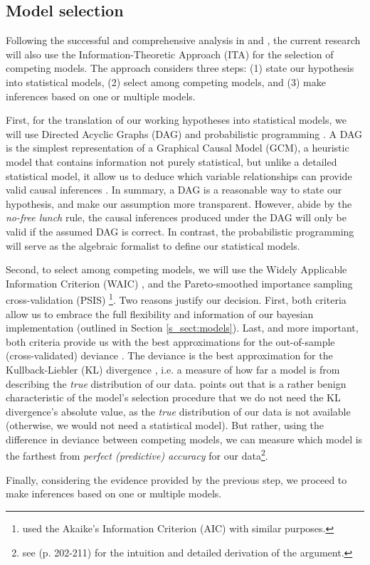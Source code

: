 \subsection{Model selection}
%
Following the successful and comprehensive analysis in \citet{vanDaal_2020} and \citet{Lesterhuis_2018}, the current research will also use the Information-Theoretic Approach (ITA) \citep{Anderson_2008, Chamberlain_1965} for the selection of competing models. The approach considers three steps: (1) state our hypothesis into statistical models, (2) select among competing models, and (3) make inferences based on one or multiple models.

First, for the translation of our working hypotheses into statistical models, we will use Directed Acyclic Graphs (DAG) and probabilistic programming \citep{Jaynes_2003}. A DAG is the simplest representation of a Graphical Causal Model (GCM), a heuristic model that contains information not purely statistical, but unlike a detailed statistical model, it allow us to deduce which variable relationships can provide valid causal inferences \citep{Hernan_et_al_2020, McElreath_2020}. In summary, a DAG is a reasonable way to state our hypothesis, and make our assumption more transparent. However, abide by the \textit{no-free lunch} rule, the causal inferences produced under the DAG will only be valid if the assumed DAG is correct. In contrast, the probabilistic programming will serve as the algebraic formalist to define our statistical models.

Second, to select among competing models, we will use the Widely Applicable Information Criterion (WAIC) \citep{Watanabe_2013}, and the Pareto-smoothed importance sampling cross-validation (PSIS) \citep{Vehtari_et_al_2021}\footnote{\citet{vanDaal_2020} used the Akaike’s Information Criterion (AIC) \citep{Akaike_1974} with similar purposes.}. Two reasons justify our decision. First, both criteria allow us to embrace the full flexibility and information of our bayesian implementation (outlined in Section \ref{s_sect:models}). Last, and more important, both criteria provide us with the best approximations for the out-of-sample (cross-validated) deviance \citep{McElreath_2020}. The deviance is the best approximation for the Kullback-Liebler (KL) divergence \citep{Kullback_et_al_1951}, i.e. a measure of how far a model is from describing the \textit{true} distribution of our data. \citet{McElreath_2020} points out that is a rather benign characteristic of the model's selection procedure that we do not need the KL divergence's absolute value, as the \textit{true} distribution of our data is not available (otherwise, we would not need a statistical model). But rather, using the difference in deviance between competing models, we can measure which model is the farthest from \textit{perfect (predictive) accuracy} for our data\footnote{see \citet{McElreath_2020} (p. 202-211) for the intuition and detailed derivation of the argument.}.

Finally, considering the evidence provided by the previous step, we proceed to make inferences based on one or multiple models.